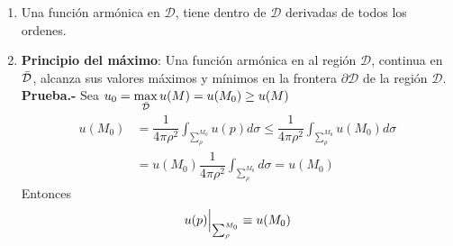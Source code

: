 \documentclass[../main]{subfiles}
\begin{document}
\begin{enumerate}
    \item Una función armónica en $\mathcal{D}$, tiene dentro de $\mathcal{D}$ derivadas de todos los ordenes.
    \item \textbf{Principio del máximo}: Una función armónica en al región $\mathcal{D}$, continua en $\Bar{\mathcal{D}}$, alcanza sus valores máximos y mínimos en la frontera $\partial \mathcal{D}$ de la región $\mathcal{D}$. \\[0.3cm]
    \textbf{Prueba.-} Sea $u_0=\max\limits_{\Bar{\mathcal{D}}} u(M)=u(M_0)\geq u(M)$
    \begin{align}
        u(M_0)&=\dfrac{1}{4\pi \rho^2} \int_{\sum_{\rho}^{M_0}}u(p)d\sigma\leq \dfrac{1}{4\pi \rho^2} \int_{\sum_{\rho}^{M_0}} u(M_0) d\sigma \\
        &=u(M_0) \dfrac{1}{4\pi \rho^2} \int_{\sum_{\rho}^{M_0}} d\sigma=u(M_0)
    \end{align}
    Entonces
    \begin{equation}
        u(p)\Big{|}_{\sum_{\rho}^{M_0}}\equiv u(M_0)
    \end{equation}
\end{enumerate}
\end{document}
